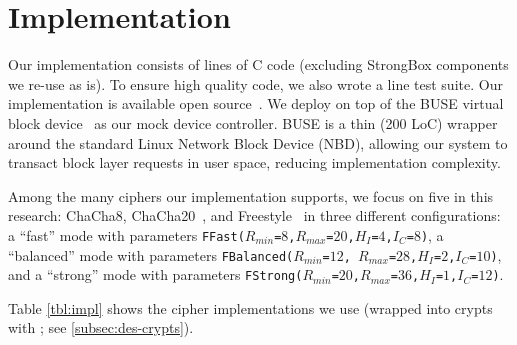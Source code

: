 \section{Implementation}\label{sec:impl}

Our \sys implementation consists of \locTotal lines of C code (excluding
StrongBox components we re-use as is). To ensure high quality code, we also
wrote a \locTest line test suite. Our implementation is available open
source~. We deploy \sys on top of the BUSE virtual block
device~\cite{BUSE} as our mock device controller. BUSE is a thin (200 LoC)
wrapper around the standard Linux Network Block Device (NBD), allowing our
system to transact block layer requests in user space, reducing implementation
complexity.



Among the many ciphers our implementation supports, we focus on five in this
research: ChaCha8, ChaCha20~\cite{ChaCha20}, and Freestyle~\cite{Freestyle} in
three different configurations: a ``fast'' mode with parameters
\texttt{FFast($R_{min}$=$8$,$R_{max}$=$20$,$H_I$=$4$,$I_C$=$8$)}, a ``balanced''
mode with parameters \texttt{FBalanced($R_{min}$=$12$,
$R_{max}$=$28$,$H_I$=$2$,$I_C$=$10$)}, and a ``strong'' mode with parameters
\texttt{FStrong($R_{min}$=$20$,$R_{max}$=$36$,$H_I$=$1$,$I_C$=$12$)}.

Table \cref{tbl:impl} shows the cipher implementations we use (wrapped into
crypts with \sysB; see \cref{subsec:des-crypts}).

